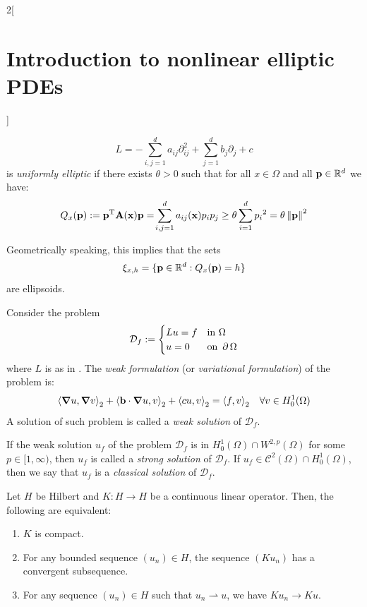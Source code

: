 \documentclass[../../../main_math.tex]{subfiles}
\begin{document}
\begin{multicols}{2}[\section{Introduction to nonlinear elliptic PDEs}]
\begin{definition}
    \begin{equation}\label{INEPDE:operator}
      L=-\sum_{i,j=1}^da_{ij}\partial_{ij}^2 + \sum_{j=1}^d b_j\partial_j+c
    \end{equation}
    is \emph{uniformly elliptic} if there exists $\theta>0$ such that for all $x\in \Omega$ and all $\boldsymbol{\mathrm{p}}\in \mathbb{R}^d$ we have:
    \begin{equation*}
      Q_x(\boldsymbol{\mathrm{p}}):={\boldsymbol{\mathrm{p}}}^{\mathrm{T}}\boldsymbol{\mathrm{A}}(\boldsymbol{\mathrm{x}})\boldsymbol{\mathrm{p}}=\!\sum_{i,j=1}^da_{ij}(\boldsymbol{\mathrm{x}})p_ip_j\geq \theta \sum_{i=1}^{d} {p_i}^2=\theta \left\|\boldsymbol{\mathrm{p}}\right\|^2
    \end{equation*}
  \end{definition}
  \begin{remark}
    Geometrically speaking, this implies that the sets
    $$
      \xi_{x,h}=\{ \boldsymbol{\mathrm{p}}\in \mathbb{R}^d: Q_x(\boldsymbol{\mathrm{p}})=h\}
    $$
    are ellipsoids.
  \end{remark}
  \begin{definition}
    Consider the problem
    $$
      \mathcal{D}_f:=\begin{cases}
        Lu=f & \text{in }\Omega      \\
        u=0  & \text{on }\operatorname{\partial}{\Omega}
      \end{cases}
    $$
    where $L$ is as in . The \emph{weak formulation} (or \emph{variational formulation}) of the problem is:
    \begin{equation*}
      {\langle \grad u,\grad v\rangle}_2+{\langle \boldsymbol{\mathrm{b}}\cdot \grad u,v\rangle}_2 + {\langle cu,v\rangle}_2={\langle f,v\rangle}_2\quad \forall v\in H_0^1(\Omega)
    \end{equation*}
    A solution of such problem is called a \emph{weak solution} of $\mathcal{D}_f$.
  \end{definition}
  \begin{definition}
    If the weak solution $u_f$ of the problem $\mathcal{D}_f$ is in $H^1_0(\Omega)\cap W^{2,p}(\Omega)$ for some $p\in [1,\infty)$, then $u_f$ is called a \emph{strong solution} of $\mathcal{D}_f$. If $u_f\in \mathcal{C}^2(\Omega)\cap H^1_0(\Omega)$, then we say that $u_f$ is a \emph{classical solution} of $\mathcal{D}_f$.
  \end{definition}
  \begin{proposition}
    Let $H$ be Hilbert and $K:H\to H$ be a continuous linear operator. Then, the following are equivalent:
    \begin{enumerate}
      \item $K$ is compact.
      \item For any bounded sequence $(u_n)\in H$, the sequence $(Ku_n)$ has a convergent subsequence.
      \item For any sequence $(u_n)\in H$ such that $u_n\rightharpoonup u$, we have $Ku_n\to Ku$.
    \end{enumerate}
  \end{proposition}

\end{multicols}
\end{document}
